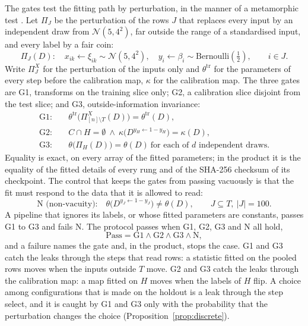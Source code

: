 The gates test the fitting path by perturbation, in the manner of a metamorphic test \citep{chen2018,segura2016}. Let $\Pi_J$ be the perturbation of the rows $J$ that replaces every input by an independent draw from $\mathcal N(5,4^2)$, far outside the range of a standardised input, and every label by a fair coin:
\begin{equation}
\Pi_J(D):\quad x_{ik}\leftarrow\xi_{ik}\sim\mathcal N(5,4^2),\quad y_i\leftarrow\beta_i\sim\mathrm{Bernoulli}(\tfrac12),\qquad i\in J.
\label{eq:perturb}
\end{equation}
Write $\Pi^{X}_J$ for the perturbation of the inputs only and $\theta^{\mathrm{tr}}$ for the parameters of every step before the calibration map, $\kappa$ for the calibration map. The three gates are G1, transforms on the training slice only; G2, a calibration slice disjoint from the test slice; and G3, outside-information invariance:
\begin{align}
\mathrm{G1}:&\quad \theta^{\mathrm{tr}}\bigl(\Pi^{X}_{[n]\setminus T}(D)\bigr)=\theta^{\mathrm{tr}}(D),\label{eq:g1}\\
\mathrm{G2}:&\quad C\cap H=\emptyset\ \wedge\ \kappa\bigl(D^{y_H\leftarrow1-y_H}\bigr)=\kappa(D),\label{eq:g2}\\
\mathrm{G3}:&\quad \theta\bigl(\Pi_H(D)\bigr)=\theta(D)\ \text{for each of }d\text{ independent draws.}\label{eq:g3}
\end{align}
Equality is exact, on every array of the fitted parameters; in the product it is the equality of the fitted details of every rung and of the SHA-256 checksum of its checkpoint. The control that keeps the gates from passing vacuously is that the fit must respond to the data that it is allowed to read:
\begin{equation}
\text{N (non-vacuity):}\quad \theta\bigl(D^{y_{J}\leftarrow1-y_{J}}\bigr)\neq\theta(D),\qquad J\subseteq T,\ |J|=100.
\label{eq:nv}
\end{equation}
A pipeline that ignores its labels, or whose fitted parameters are constants, passes G1 to G3 and fails N. The protocol passes when G1, G2, G3 and N all hold,
\begin{equation}
\mathrm{Pass}=\mathrm{G1}\wedge\mathrm{G2}\wedge\mathrm{G3}\wedge\mathrm{N},
\label{eq:pass}
\end{equation}
and a failure names the gate and, in the product, stops the case. G1 and G3 catch the leaks through the steps that read rows: a statistic fitted on the pooled rows moves when the inputs outside $T$ move. G2 and G3 catch the leaks through the calibration map: a map fitted on $H$ moves when the labels of $H$ flip. A choice among configurations that is made on the holdout is a leak through the step select, and it is caught by G1 and G3 only with the probability that the perturbation changes the choice (Proposition~\ref{prop:discrete}).

